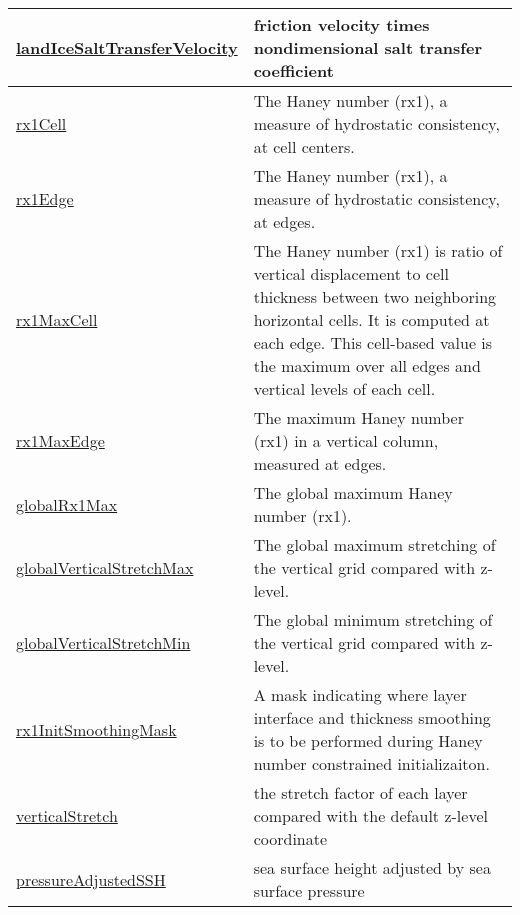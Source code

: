 {\begin{center}
\begin{longtable}{| p{2.0in} | p{4.0in} |}
    \hline
    \hyperref[subsec:var_sec_diagnostics_landIceSaltTransferVelocity]{landIceSaltTransferVelocity} & friction velocity times nondimensional salt transfer coefficient \\
    \hline
    \hyperref[subsec:var_sec_diagnostics_rx1Cell]{rx1Cell} & The Haney number (rx1), a measure of hydrostatic consistency, at cell centers. \\
    \hline
    \hyperref[subsec:var_sec_diagnostics_rx1Edge]{rx1Edge} & The Haney number (rx1), a measure of hydrostatic consistency, at edges. \\
    \hline
    \hyperref[subsec:var_sec_diagnostics_rx1MaxCell]{rx1MaxCell} & The Haney number (rx1) is ratio of vertical displacement to cell thickness between two neighboring horizontal cells.  It is computed at each edge.  This cell-based value is the maximum over all edges and vertical levels of each cell. \\
    \hline
    \hyperref[subsec:var_sec_diagnostics_rx1MaxEdge]{rx1MaxEdge} & The maximum Haney number (rx1) in a vertical column, measured at edges. \\
    \hline
    \hyperref[subsec:var_sec_diagnostics_globalRx1Max]{globalRx1Max} & The global maximum Haney number (rx1). \\
    \hline
    \hyperref[subsec:var_sec_diagnostics_globalVerticalStretchMax]{globalVerticalStretchMax} & The global maximum stretching of the vertical grid compared with z-level. \\
    \hline
    \hyperref[subsec:var_sec_diagnostics_globalVerticalStretchMin]{globalVerticalStretchMin} & The global minimum stretching of the vertical grid compared with z-level. \\
    \hline
    \hyperref[subsec:var_sec_diagnostics_rx1InitSmoothingMask]{rx1InitSmoothingMask} & A mask indicating where layer interface and thickness smoothing is to be performed during Haney number constrained initializaiton. \\
    \hline
    \hyperref[subsec:var_sec_diagnostics_verticalStretch]{verticalStretch} & the stretch factor of each layer compared with the default z-level coordinate \\
    \hline
    \hyperref[subsec:var_sec_diagnostics_pressureAdjustedSSH]{pressureAdjustedSSH} & sea surface height adjusted by sea surface pressure \\
    \hline
\end{longtable}
\end{center}
}
